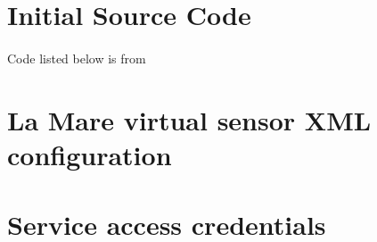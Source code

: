 \begin{appendices}
    \section{Initial Source Code}
    \label{appendix:fcode}
    \paragraph{}Code listed below is from \cite{pal}
    
    \clearpage
    \section{La Mare virtual sensor XML configuration}
    \label{appendix:vsensor}
    
    \clearpage
	\section{Service access credentials}
	\label{appendix:cred}
	
	\clearpage
\end{appendices}